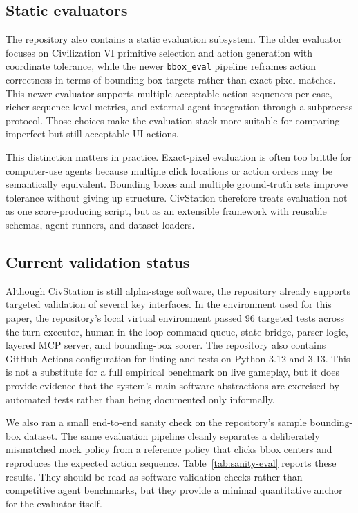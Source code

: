 \subsection{Static evaluators}

The repository also contains a static evaluation subsystem. The older evaluator focuses on Civilization VI primitive selection and action generation with coordinate tolerance, while the newer \texttt{bbox\_eval} pipeline reframes action correctness in terms of bounding-box targets rather than exact pixel matches. This newer evaluator supports multiple acceptable action sequences per case, richer sequence-level metrics, and external agent integration through a subprocess protocol. Those choices make the evaluation stack more suitable for comparing imperfect but still acceptable UI actions.

This distinction matters in practice. Exact-pixel evaluation is often too brittle for computer-use agents because multiple click locations or action orders may be semantically equivalent. Bounding boxes and multiple ground-truth sets improve tolerance without giving up structure. CivStation therefore treats evaluation not as one score-producing script, but as an extensible framework with reusable schemas, agent runners, and dataset loaders.

\subsection{Current validation status}

Although CivStation is still alpha-stage software, the repository already supports targeted validation of several key interfaces. In the environment used for this paper, the repository's local virtual environment passed 96 targeted tests across the turn executor, human-in-the-loop command queue, state bridge, parser logic, layered MCP server, and bounding-box scorer. The repository also contains GitHub Actions configuration for linting and tests on Python 3.12 and 3.13. This is not a substitute for a full empirical benchmark on live gameplay, but it does provide evidence that the system's main software abstractions are exercised by automated tests rather than being documented only informally.

We also ran a small end-to-end sanity check on the repository's sample bounding-box dataset. The same evaluation pipeline cleanly separates a deliberately mismatched mock policy from a reference policy that clicks bbox centers and reproduces the expected action sequence. Table~\ref{tab:sanity-eval} reports these results. They should be read as software-validation checks rather than competitive agent benchmarks, but they provide a minimal quantitative anchor for the evaluator itself.

